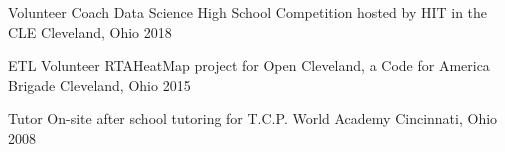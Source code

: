 

\begin{cvhonors}

  \cvhonor
    {Volunteer Coach} %
    {Data Science High School Competition hosted by HIT in the CLE} %
    {Cleveland, Ohio} %
    {2018} %

  \cvhonor
    {ETL Volunteer} %
    {RTAHeatMap project for Open Cleveland, a Code for America Brigade} %
    {Cleveland, Ohio} %
    {2015} %

  \cvhonor
    {Tutor} %
    {On-site after school tutoring for T.C.P. World Academy} %
    {Cincinnati, Ohio} %
    {2008} %

\end{cvhonors}
